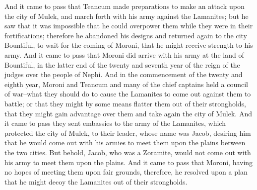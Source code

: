 And it came to pass that Teancum made preparations to make an attack upon the city of Mulek, and march forth with his army against the Lamanites; but he saw that it was impossible that he could overpower them while they were in their fortifications; therefore he abandoned his designs and returned again to the city Bountiful, to wait for the coming of Moroni, that he might receive strength to his army.
\bverse \iffalse And it came to pass that Moroni did arrive with his army at the land of Bountiful, in the latter end of the twenty and seventh year of the reign of the judges over the people of Nephi. \fi
And it came to pass that Moroni did arrive with his army at the land of Bountiful, in the latter end of the twenty and seventh year of the reign of the judges over the people of Nephi.
\bverse \iffalse And in the commencement of the twenty and eighth year, Moroni and Teancum and many of the chief captains held a council of war--what they should do to cause the Lamanites to come out against them to battle; or that they might by some means flatter them out of their strongholds, that they might gain advantage over them and take again the city of Mulek. \fi
And in the commencement of the twenty and eighth year, Moroni and Teancum and many of the chief captains held a council of war--what they should do to cause the Lamanites to come out against them to battle; or that they might by some means flatter them out of their strongholds, that they might gain advantage over them and take again the city of Mulek.
\bverse \iffalse And it came to pass they sent embassies to the army of the Lamanites, which protected the city of Mulek, to their leader, whose name was Jacob, desiring him that he would come out with his armies to meet them upon the plains between the two cities.  But behold, Jacob, who was a Zoramite, would not come out with his army to meet them upon the plains. \fi
And it came to pass they sent embassies to the army of the Lamanites, which protected the city of Mulek, to their leader, whose name was Jacob, desiring him that he would come out with his armies to meet them upon the plains between the two cities.  But behold, Jacob, who was a Zoramite, would not come out with his army to meet them upon the plains.
\bverse \iffalse And it came to pass that Moroni, having no hopes of meeting them upon fair grounds, therefore, he resolved upon a plan that he might decoy the Lamanites out of their strongholds. \fi
And it came to pass that Moroni, having no hopes of meeting them upon fair grounds, therefore, he resolved upon a plan that he might decoy the Lamanites out of their strongholds.
